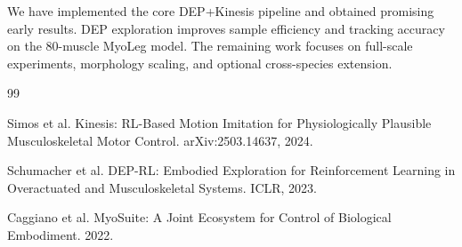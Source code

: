 \documentclass{article}
\begin{document}
We have implemented the core DEP+Kinesis pipeline and obtained promising early results. DEP exploration improves sample efficiency and tracking accuracy on the 80-muscle MyoLeg model. The remaining work focuses on full-scale experiments, morphology scaling, and optional cross-species extension.


\begin{thebibliography}{99}

Simos et al. Kinesis: RL-Based Motion Imitation for Physiologically Plausible Musculoskeletal Motor Control. arXiv:2503.14637, 2024.

Schumacher et al. DEP-RL: Embodied Exploration for Reinforcement Learning in Overactuated and Musculoskeletal Systems. ICLR, 2023.

Caggiano et al. MyoSuite: A Joint Ecosystem for Control of Biological Embodiment. 2022.

\end{thebibliography}
\end{document}

